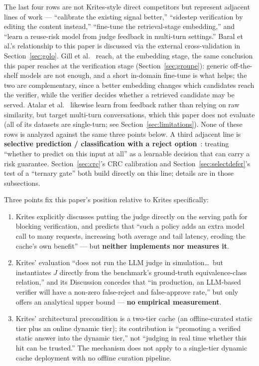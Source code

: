 \documentclass[11pt]{article}
\begin{document}
The last four rows are not Krites-style direct competitors but represent adjacent lines of work --- ``calibrate the existing signal better,'' ``sidestep verification by editing the content instead,'' ``fine-tune the retrieval-stage embedding,'' and ``learn a reuse-risk model from judge feedback in multi-turn settings.'' Baral et al.'s relationship to this paper is discussed via the external cross-validation in Section~\ref{sec:golo}. Gill et al.~\cite{gill25} reach, at the embedding stage, the same conclusion this paper reaches at the verification stage (Section~\ref{sec:groupe}): generic off-the-shelf models are not enough, and a short in-domain fine-tune is what helps; the two are complementary, since a better embedding changes which candidates reach the verifier, while the verifier decides whether a retrieved candidate may be served. Atalar et al.~\cite{atalar26} likewise learn from feedback rather than relying on raw similarity, but target multi-turn conversations, which this paper does not evaluate (all of its datasets are single-turn; see Section~\ref{sec:limitations}). None of these rows is analyzed against the same three points below. A third adjacent line is \textbf{selective prediction / classification with a reject option}~\cite{chow70,elyaniv10,geifman17,cortes16,mozannar20,conformalreject}: treating ``whether to predict on this input at all'' as a learnable decision that can carry a risk guarantee. Section~\ref{sec:crc}'s CRC calibration and Section~\ref{sec:selectdefer}'s test of a ``ternary gate'' both build directly on this line; details are in those subsections.

Three points fix this paper's position relative to Krites specifically:

\begin{enumerate}[leftmargin=*]
  \item Krites explicitly discusses putting the judge directly on the serving path for blocking verification, and predicts that ``such a policy adds an extra model call to many requests, increasing both average and tail latency, eroding the cache's own benefit'' --- but \textbf{neither implements nor measures it}.
  \item Krites' evaluation ``does not run the LLM judge in simulation\ldots\ but instantiates $J$ directly from the benchmark's ground-truth equivalence-class relation,'' and its Discussion concedes that ``in production, an LLM-based verifier will have a non-zero false-reject and false-approve rate,'' but only offers an analytical upper bound --- \textbf{no empirical measurement}.
  \item Krites' architectural precondition is a two-tier cache (an offline-curated static tier plus an online dynamic tier); its contribution is ``promoting a verified static answer into the dynamic tier,'' not ``judging in real time whether this hit can be trusted.'' The mechanism does not apply to a single-tier dynamic cache deployment with no offline curation pipeline.
\end{enumerate}
\end{document}
